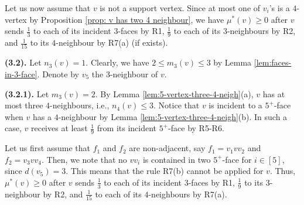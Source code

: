 \documentclass[12pt, reqno]{amsart}
\theoremstyle{plain}
\theoremstyle{definition}
\numberwithin{equation}{section}
\begin{document}
Let us now assume that $v$ is not a support vertex.  Since at most one of $v_i$'s is a $4$-vertex by Proposition \ref{prop:  v has two 4 neighbour}, we have  $\mu^*(v)\geq 0$ after $v$  sends  $\frac{1}{3}$ to each of its incident $3$-faces by R1, $\frac{1}{9}$ to each of its $3$-neighbours by R2, and $\frac{1}{15}$ to its $4$-neighbour by R7(a) (if exists). \medskip



 
 
\textbf{(3.2).} Let $n_3(v)=1$. Clearly, we have $2\leq m_3(v)\leq 3$ by Lemma \ref{lem:faces-in-3-face}. Denote by $v_5$ the $3$-neighbour of $v$.  \medskip
 
 
\textbf{(3.2.1).} Let $ m_3(v)=2$. By Lemma \ref{lem:5-vertex-three-4-neigh}(a), $v$ has at most three $4$-neighbours, i.e., $n_4(v)\leq 3$. 
Notice that $v$ is incident to  a $5^+$-face when $v$ has a $4$-neighbour by Lemma \ref{lem:5-vertex-three-4-neigh}(b). In such a case, $v$ receives at least $\frac{1}{9}$ from its incident $5^+$-face by R5-R6. 



Let us first assume that $f_1$ and $f_2$ are non-adjacent, say $f_1=v_1vv_2$ and $f_2=v_3vv_4$. Then, we note that no $vv_i$ is contained in two $5^+$-face for $i \in [5]$, since $d(v_5)=3$. This means that the rule R7(b) cannot be applied for $v$. Thus,  $\mu^*(v) \geq 0$ after $v$ sends $\frac{1}{3}$ to each of its incident $3$-faces by R1, $\frac{1}{9}$ to its $3$-neighbour by R2, and  $\frac{1}{15}$ to each of its $4$-neighbours by R7(a).
\end{document}
